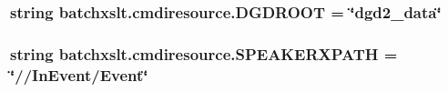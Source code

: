 \subsubsection[{D\+G\+D\+R\+O\+O\+T}]{\setlength{\rightskip}{0pt plus 5cm}string batchxslt.\+cmdiresource.\+D\+G\+D\+R\+O\+O\+T = \char`\"{}dgd2\+\_\+data\char`\"{}}\label{namespacebatchxslt_1_1cmdiresource_a545fd40ddfc73856f5b84e69f214d74b}
\hypertarget{namespacebatchxslt_1_1cmdiresource_a0bb689afce27aa1d1e418d3c25b00378}{}
\subsubsection[{S\+P\+E\+A\+K\+E\+R\+X\+P\+A\+T\+H}]{\setlength{\rightskip}{0pt plus 5cm}string batchxslt.\+cmdiresource.\+S\+P\+E\+A\+K\+E\+R\+X\+P\+A\+T\+H = \char`\"{}//In\+Event/Event\char`\"{}}\label{namespacebatchxslt_1_1cmdiresource_a0bb689afce27aa1d1e418d3c25b00378}
